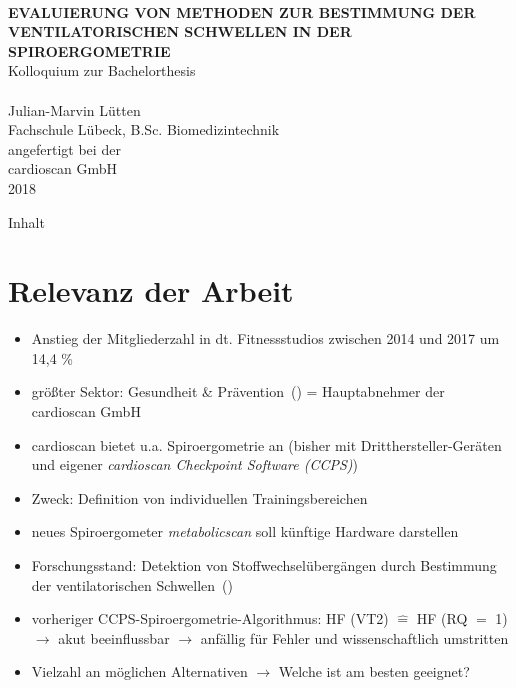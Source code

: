 \documentclass[colorBG,slideColor,8pt]{beamer}
\newcommand{\talktitle}{Evaluierung von Methoden zur Bestimmung der ventilatorischen Schwellen in der Spiroergometrie}
\begin{document}
\begin{frame}
    \vspace{-10ex}
    \textcolor{fhlred}{\HRuleFill[0.4ex]} \\ \vspace{1ex}
    {\linespread{1.5}\selectfont
    \MakeUppercase{\bf \huge \talktitle}\\[5.5ex]}
    \normalsize Kolloquium zur Bachelorthesis\\
    \textcolor{fhlred}{\HRuleFill[0.1ex]} \\ \vspace{4ex}
    \small Julian-Marvin Lütten\\
    \small Fachschule Lübeck, B.Sc. Biomedizintechnik\\
    \vspace{2ex}
    \small angefertigt bei der\\
    \small cardioscan GmbH\\
    \small 2018
\end{frame}

\begin{frame}{Inhalt}
\tableofcontents
\end{frame}


\section{Relevanz der Arbeit}

\begin{frame}
\begin{itemize}
	\item Anstieg der Mitgliederzahl in dt. Fitnessstudios zwischen 2014 und 2017 um 14,4 \%
	\item größter Sektor: Gesundheit \& Prävention~(\cite{DSSV.2018}) = Hauptabnehmer der cardioscan GmbH
	\item cardioscan bietet u.a. Spiroergometrie an (bisher mit Dritthersteller-Geräten und eigener \textsl{cardioscan Checkpoint Software (CCPS)})
	\item Zweck: Definition von individuellen Trainingsbereichen
	\item neues Spiroergometer \textsl{metabolicscan} soll künftige Hardware darstellen
	\item Forschungsstand: Detektion von Stoffwechselübergängen durch Bestimmung der ventilatorischen Schwellen~(\cite{Westhoff.2012})
	\item vorheriger CCPS-Spiroergometrie-Algorithmus: HF (VT2) $\hat{=}$  HF (RQ $=$ 1)\\$\rightarrow$ akut beeinflussbar $\rightarrow$ anfällig für Fehler und wissenschaftlich umstritten
	\item Vielzahl an möglichen Alternativen $\rightarrow$ Welche ist am besten geeignet?
\end{itemize}
\end{frame}
\end{document}
